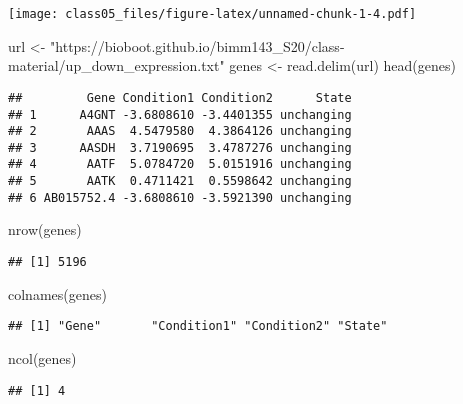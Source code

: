 \documentclass[
]{article}
\newenvironment{Shaded}{\begin{snugshade}}{\end{snugshade}}
\newcommand{\FunctionTok}[1]{\textcolor[rgb]{0.00,0.00,0.00}{#1}}
\newcommand{\NormalTok}[1]{#1}
\newcommand{\OtherTok}[1]{\textcolor[rgb]{0.56,0.35,0.01}{#1}}
\newcommand{\StringTok}[1]{\textcolor[rgb]{0.31,0.60,0.02}{#1}}
\begin{document}
\texttt{[image: class05\_files/figure-latex/unnamed-chunk-1-4.pdf]}

\begin{Shaded}
\begin{Highlighting}[]
\NormalTok{url }\OtherTok{\textless{}{-}} \StringTok{"https://bioboot.github.io/bimm143\_S20/class{-}material/up\_down\_expression.txt"}
\NormalTok{genes }\OtherTok{\textless{}{-}} \FunctionTok{read.delim}\NormalTok{(url)}
\FunctionTok{head}\NormalTok{(genes)}
\end{Highlighting}
\end{Shaded}

\begin{verbatim}
##         Gene Condition1 Condition2      State
## 1      A4GNT -3.6808610 -3.4401355 unchanging
## 2       AAAS  4.5479580  4.3864126 unchanging
## 3      AASDH  3.7190695  3.4787276 unchanging
## 4       AATF  5.0784720  5.0151916 unchanging
## 5       AATK  0.4711421  0.5598642 unchanging
## 6 AB015752.4 -3.6808610 -3.5921390 unchanging
\end{verbatim}

\begin{Shaded}
\begin{Highlighting}[]
\FunctionTok{nrow}\NormalTok{(genes)}
\end{Highlighting}
\end{Shaded}

\begin{verbatim}
## [1] 5196
\end{verbatim}

\begin{Shaded}
\begin{Highlighting}[]
\FunctionTok{colnames}\NormalTok{(genes)}
\end{Highlighting}
\end{Shaded}

\begin{verbatim}
## [1] "Gene"       "Condition1" "Condition2" "State"
\end{verbatim}

\begin{Shaded}
\begin{Highlighting}[]
\FunctionTok{ncol}\NormalTok{(genes)}
\end{Highlighting}
\end{Shaded}

\begin{verbatim}
## [1] 4
\end{verbatim}
\end{document}
